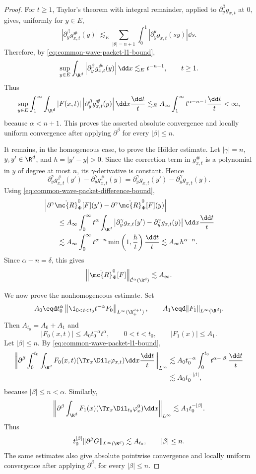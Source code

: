 \begin{proof}
For \(t\ge 1\), Taylor's theorem with integral remainder, applied to \(\partial_y^\beta g_{x,t}\) at \(0\), gives, uniformly for \(y\in E\),
\[
\left|
\partial_y^\beta g^\#_{x,t}(y)
\right|
\lesssim_E
\sum_{|\theta|=n+1}
\int_0^1
\left|
\partial_y^\theta g_{x,t}(sy)
\right|
\dd s .
\]
Therefore, by \eqref{eq:common-wave-packet-l1-bound},
\[
\sup_{y\in E}
\int_{\R^d}
\left|
\partial_y^\beta g^\#_{x,t}(y)
\right|
\dd x
\lesssim_E
t^{-n-1},
\qquad t\ge 1.
\]
Thus
\[
\sup_{y\in E}
\int_1^\infty\int_{\R^d}
|F(x,t)|
\left|
\partial_y^\beta g^\#_{x,t}(y)
\right|
\dd x\frac{\dd t}{t}
\lesssim_E
A_\infty
\int_1^\infty t^{\alpha-n-1}\frac{\dd t}{t}
<\infty,
\]
because \(\alpha<n+1\).
This proves the asserted absolute convergence and locally uniform convergence after applying \(\partial^\beta\) for every \(|\beta|\le n\).

It remains, in the homogeneous case, to prove the Hölder estimate.
Let \(|\gamma|=n\), \(y,y'\in\R^d\), and \(h=|y'-y|>0\).
Since the correction term in \(g^\#_{x,t}\) is a polynomial in \(y\) of degree at most \(n\), its \(\gamma\)-derivative is constant.
Hence
\[
\partial_y^\gamma g^\#_{x,t}(y')
-
\partial_y^\gamma g^\#_{x,t}(y)
=
\partial_y^\gamma g_{x,t}(y')
-
\partial_y^\gamma g_{x,t}(y).
\]
Using \eqref{eq:common-wave-packet-difference-bound},
\[
\begin{aligned}
   &
  \left|
  \partial^\gamma\dot{\mc{R}}^0_{\Phi}[F](y')
  -
  \partial^\gamma\dot{\mc{R}}^0_{\Phi}[F](y)
  \right|
  \\
   & \qquad\le
  A_\infty
  \int_0^\infty
  t^\alpha
  \int_{\R^d}
  \left|
  \partial_y^\gamma g_{x,t}(y')
  -
  \partial_y^\gamma g_{x,t}(y)
  \right|
  \dd x
  \frac{\dd t}{t}
  \\
   & \qquad\lesssim
  A_\infty
  \int_0^\infty
  t^{\alpha-n}
  \min\left(1,\frac{h}{t}\right)
  \frac{\dd t}{t}
  \lesssim
  A_\infty h^{\alpha-n}.
\end{aligned}
\]
Since \(\alpha-n=\delta\), this gives
\[
\left\|\dot{\mc{R}}^0_{\Phi}[F]\right\|_{\dot{\mathcal{C}}^\alpha(\R^d)}
\lesssim
A_\infty .
\]

We now prove the nonhomogeneous estimate.
Set
\[
A_0\eqd t_0^\alpha \left\| \1_{0<t<t_0}t^{-\alpha}F_0 \right\|_{L^\infty(\R^{d+1}_+)},
\qquad A_1\eqd \|F_1\|_{L^\infty(\R^d)}.
\]
Then \(A_{t_0}=A_0+A_1\) and
\[
|F_0(x,t)|\le A_0t_0^{-\alpha}t^\alpha, \qquad 0<t<t_0, \qquad |F_1(x)|\le A_1.
\]
Let \(|\beta|\le n\).
By \eqref{eq:common-wave-packet-l1-bound},
\[
\begin{aligned}
\left\|\partial^\beta \int_0^{t_0}\int_{\R^d} F_0(x,t) (\Tr_x\Dil_t\varphi_{x,t}) \dd x\frac{\dd t}{t} \right\|_{L^\infty}
& \lesssim A_0t_0^{-\alpha} \int_0^{t_0} t^{\alpha-|\beta|} \frac{\dd t}{t}
\\
& \lesssim A_0t_0^{-|\beta|},
\end{aligned}
\]
because \(|\beta|\le n<\alpha\).
Similarly,
\[
\left\| \partial^\beta \int_{\R^d} F_1(x) (\Tr_x\Dil_{t_0}\varphi^0_x) \dd x \right\|_{L^\infty} \lesssim A_1t_0^{-|\beta|}.
\]
Thus
\[
t_0^{|\beta|}\|\partial^\beta G\|_{L^\infty(\R^d)} \lesssim A_{t_0}, \qquad |\beta|\le n.
\]
The same estimates also give absolute pointwise convergence and locally uniform convergence after applying \(\partial^\beta\), for every \(|\beta|\le n\).


\end{proof}
